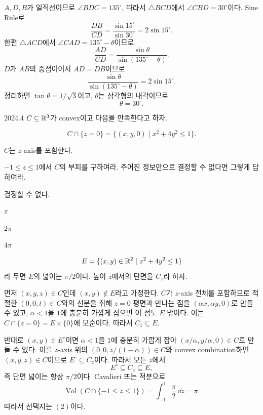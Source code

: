 \begin{solution}
$A,D,B$가 일직선이므로 $\angle BDC=135^\circ$, 따라서 $\triangle BCD$에서 $\angle CBD=30^\circ$이다. Sine Rule로
\[
\frac{DB}{CD}=\frac{\sin15^\circ}{\sin30^\circ}=2\sin15^\circ.
\]
한편 $\triangle ACD$에서 $\angle CAD=135^\circ-\theta$이므로
\[
\frac{AD}{CD}=\frac{\sin\theta}{\sin(135^\circ-\theta)}.
\]
$D$가 $AB$의 중점이어서 $AD=DB$이므로
\[
\frac{\sin\theta}{\sin(135^\circ-\theta)}=2\sin15^\circ.
\]
정리하면 $\tan\theta=1/\sqrt3$이고, $\theta$는 삼각형의 내각이므로
\[
\boxed{\theta=30^\circ}.
\]
\end{solution}

\begin{pastproblem}{2024.4}
$C\subseteq\mathbb{R}^3$가 convex이고 다음을 만족한다고 하자.
\begin{problemchoices}
\item
\[
C\cap\{z=0\}=\{(x,y,0)\mid x^2+4y^2\le1\}.
\]
\item $C$는 $z$-axis를 포함한다.
\end{problemchoices}
$-1\le z\le1$에서 $C$의 부피를 구하여라. 주어진 정보만으로 결정할 수 없다면 그렇게 답하여라.
\begin{problemchoices}
\item 결정할 수 없다.
\item $\pi$
\item $2\pi$
\item $4\pi$
\end{problemchoices}
\end{pastproblem}

\begin{solution}
\[
E=\{(x,y)\in\mathbb{R}^2\mid x^2+4y^2\le1\}
\]
라 두면 $E$의 넓이는 $\pi/2$이다. 높이 $z$에서의 단면을 $C_z$라 하자.

먼저 $(x,y,z)\in C$인데 $(x,y)\notin E$라고 가정한다. $C$가 $z$-axis 전체를 포함하므로 적절한 $(0,0,t)\in C$와의 선분을 취해 $z=0$ 평면과 만나는 점을 $(\alpha x,\alpha y,0)$로 만들 수 있고, $\alpha<1$을 $1$에 충분히 가깝게 잡으면 이 점도 $E$ 밖이다. 이는 $C\cap\{z=0\}=E\times\{0\}$에 모순이다. 따라서 $C_z\subseteq E$.

반대로 $(x,y)\in E^\circ$이면 $\alpha<1$을 $1$에 충분히 가깝게 잡아 $(x/\alpha,y/\alpha,0)\in C$로 만들 수 있다. 이를 $z$-axis 위의 $(0,0,z/(1-\alpha))\in C$와 convex combination하면 $(x,y,z)\in C$이므로 $E^\circ\subseteq C_z$이다. 따라서 모든 $z$에서
\[
E^\circ\subseteq C_z\subseteq E,
\]
즉 단면 넓이는 항상 $\pi/2$이다. Cavalieri 또는 적분으로
\[
\operatorname{Vol}(C\cap\{-1\le z\le1\})
=\int_{-1}^1\frac\pi2\,\dd z
=\boxed{\pi}.
\]
따라서 선택지는 $\boxed{(2)}$이다.
\end{solution}

